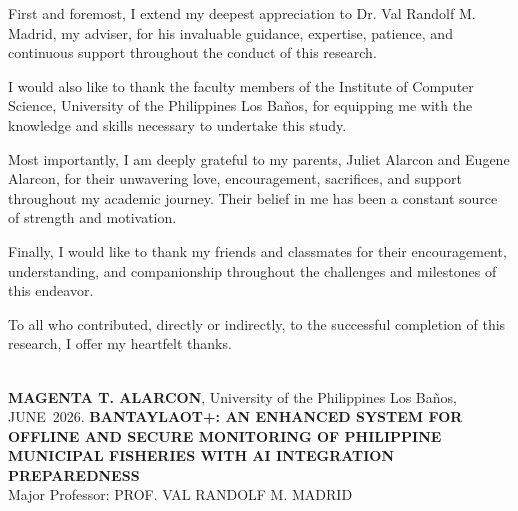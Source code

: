 \documentclass{icsthesis}
\renewcommand{\TITLE}{BANTAYLAOT+: AN ENHANCED SYSTEM FOR OFFLINE AND SECURE MONITORING OF PHILIPPINE MUNICIPAL FISHERIES WITH AI INTEGRATION PREPAREDNESS}
\renewcommand{\AUTHOR}{MAGENTA T. ALARCON}
\renewcommand{\MONTH}{JUNE}
\renewcommand{\YEAR}{2026}
\begin{document}
\begin{frontmatter}
\begin{acknowledgement}
            First and foremost, I extend my deepest appreciation to Dr. Val Randolf M. Madrid, my adviser, for his invaluable guidance, expertise, patience, and continuous support throughout the conduct of this research.

            I would also like to thank the faculty members of the Institute of Computer Science, University of the Philippines Los Baños, for equipping me with the knowledge and skills necessary to undertake this study.

            Most importantly, I am deeply grateful to my parents, Juliet Alarcon and Eugene Alarcon, for their unwavering love, encouragement, sacrifices, and support throughout my academic journey. Their belief in me has been a constant source of strength and motivation.

            Finally, I would like to thank my friends and classmates for their encouragement, understanding, and companionship throughout the challenges and milestones of this endeavor.

            To all who contributed, directly or indirectly, to the successful completion of this research, I offer my heartfelt thanks.
		\end{acknowledgement}
		
		\maketableofcontents
		
		\makelistoftables

		\makelistoffigures
	
		
		\begin{abstractwithpageno}	
		\\
		\textbf{\AUTHOR}, University of the Philippines Los Ba\~{n}os, \MONTH\ \YEAR. \textbf{\TITLE}
		\\Major Professor: PROF. VAL RANDOLF M. MADRID\\
			

\end{abstractwithpageno}
\end{frontmatter}
\end{document}
